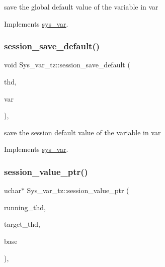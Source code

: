 save the global default value of the variable in var 

Implements \mbox{\hyperlink{classsys__var}{sys\+\_\+var}}.

\mbox{\label{classSys__var__tz_a8cbe07b66a7cd2098251817f06cb465c}} 
\subsubsection{\texorpdfstring{session\+\_\+save\+\_\+default()}{session\_save\_default()}}
{\footnotesize\ttfamily void Sys\+\_\+var\+\_\+tz\+::session\+\_\+save\+\_\+default (\begin{DoxyParamCaption}\item[{T\+HD $\ast$}]{thd,  }\item[{\mbox{\hyperlink{classset__var}{set\+\_\+var}} $\ast$}]{var }\end{DoxyParamCaption})\hspace{0.3cm}{\ttfamily [inline]}, {\ttfamily [virtual]}}

save the session default value of the variable in var 

Implements \mbox{\hyperlink{classsys__var}{sys\+\_\+var}}.

\mbox{\label{classSys__var__tz_a3c4cd63eee52952ee17acf95f5f9b05b}} 
\subsubsection{\texorpdfstring{session\+\_\+value\+\_\+ptr()}{session\_value\_ptr()}}
{\footnotesize\ttfamily uchar$\ast$ Sys\+\_\+var\+\_\+tz\+::session\+\_\+value\+\_\+ptr (\begin{DoxyParamCaption}\item[{T\+HD $\ast$}]{running\+\_\+thd,  }\item[{T\+HD $\ast$}]{target\+\_\+thd,  }\item[{L\+E\+X\+\_\+\+S\+T\+R\+I\+NG $\ast$}]{base }\end{DoxyParamCaption})\hspace{0.3cm}{\ttfamily [inline]}, {\ttfamily [virtual]}}

